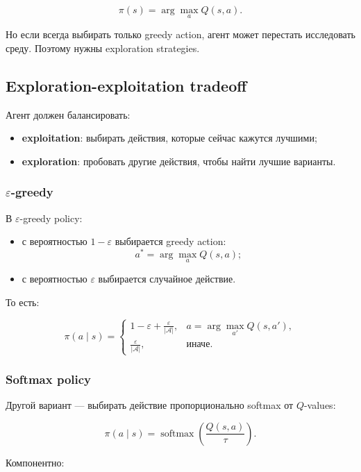\documentclass[a4paper,12pt]{article}
\begin{document}
\[
\pi(s)
=
\arg\max_a Q(s,a).
\]

Но если всегда выбирать только greedy action, агент может перестать исследовать среду. Поэтому нужны exploration strategies.

\subsection{Exploration-exploitation tradeoff}

Агент должен балансировать:

\begin{itemize}
    \item \textbf{exploitation}: выбирать действия, которые сейчас кажутся лучшими;
    \item \textbf{exploration}: пробовать другие действия, чтобы найти лучшие варианты.
\end{itemize}

\subsubsection{\texorpdfstring{\(\varepsilon\)-greedy}{epsilon-greedy}}

В \(\varepsilon\)-greedy policy:

\begin{itemize}
    \item с вероятностью \(1-\varepsilon\) выбирается greedy action:
    \[
    a^*=\arg\max_a Q(s,a);
    \]
    \item с вероятностью \(\varepsilon\) выбирается случайное действие.
\end{itemize}

То есть:

\[
\pi(a\mid s)
=
\begin{cases}
1-\varepsilon + \frac{\varepsilon}{|\mathcal{A}|}, & a = \arg\max_{a'}Q(s,a'),\\
\frac{\varepsilon}{|\mathcal{A}|}, & \text{иначе}.
\end{cases}
\]

\subsubsection{Softmax policy}

Другой вариант --- выбирать действие пропорционально softmax от \(Q\)-values:

\[
\pi(a\mid s)
=
\operatorname{softmax}
\left(
\frac{Q(s,a)}{\tau}
\right).
\]

Компонентно:
\end{document}
